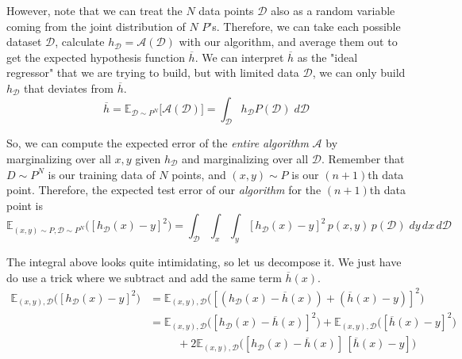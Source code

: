 \documentclass{article}
\begin{document}
  However, note that we can treat the $N$ data points $\mathcal{D}$ also as a random variable coming from the joint distribution of $N$ $P$'s. Therefore, we can take each possible dataset $\mathcal{D}$, calculate $h_\mathcal{D} = \mathcal{A}(\mathcal{D})$ with our algorithm, and average them out to get the expected hypothesis function $\overline{h}$. We can interpret $\overline{h}$ as the "ideal regressor" that we are trying to build, but with limited data $\mathcal{D}$, we can only build $h_\mathcal{D}$ that deviates from $\overline{h}$.
  \begin{equation}
    \overline{h} = \mathbb{E}_{\mathcal{D} \sim P^N} \big[ \mathcal{A}(\mathcal{D}) \big] = \int_\mathcal{D} h_\mathcal{D} P(\mathcal{D})\; d\mathcal{D}
  \end{equation}

  So, we can compute the expected error of the \textit{entire algorithm} $\mathcal{A}$ by marginalizing over all $x, y$ given $h_\mathcal{D}$ and marginalizing over all $\mathcal{D}$. Remember that $D \sim P^N$ is our training data of $N$ points, and $(x, y) \sim P$ is our $(n+1)$th data point. Therefore, the expected test error of our \textit{algorithm} for the $(n+1)$th data point is
  \begin{equation}
    \mathbb{E}_{(x, y) \sim P, \mathcal{D} \sim P^N} \big( [ h_\mathcal{D} (x) - y]^2 \big) = \int_\mathcal{D} \int_x \int_y [ h_\mathcal{D} (x) - y]^2\, p(x, y) \, p(\mathcal{D})\; dy\,dx\,d\mathcal{D}
  \end{equation}

  The integral above looks quite intimidating, so let us decompose it. We just have do use a trick where we subtract and add the same term $\overline{h}(x)$.
  \begin{align*}
    \mathbb{E}_{(x, y), \mathcal{D}} \big( [ h_\mathcal{D} (x) - y]^2 \big) & = \mathbb{E}_{(x, y), \mathcal{D}} \big( [ (h_\mathcal{D} (x) - \overline{h}(x)) + (\overline{h}(x) - y)]^2 \big) \\
    & = \mathbb{E}_{(x, y), \mathcal{D}} \big( [h_\mathcal{D} (x) - \overline{h} (x)]^2 \big) + 
    \mathbb{E}_{(x, y), \mathcal{D}} \big( [\overline{h} (x) - y]^2 \big) \\
    & \;\;\;\;\;\;\;\;\; + 2 \mathbb{E}_{(x, y), \mathcal{D}} \big([h_\mathcal{D} (x) - \overline{h} (x)]\,[\overline{h} (x) - y] \big)
  \end{align*}
\end{document}
